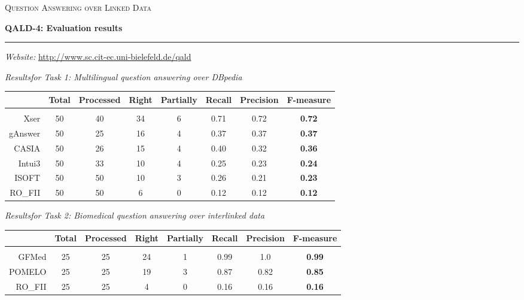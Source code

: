 \documentclass{article}
\begin{document}
\thispagestyle{empty}

\begin{center}
\textsc{\large Question Answering over Linked Data}

\vspace{.2cm}

\textbf{\huge QALD-4: Evaluation results}
\end{center}

\vspace{.4cm}

\hrule 

\vspace{.4cm}

\emph{Website:} \url{http://www.sc.cit-ec.uni-bielefeld.de/qald}

\vspace{1cm}

\emph{Results\footnotemark[1] for Task 1: Multilingual question answering over DBpedia}

\vspace{.6cm}

\begin{tabular}{rccccccc}
& Total & Processed & Right & Partially & Recall & Precision & F-measure \\
\hline \\[1ex]
Xser & 50 & 40 & 34 & 6 & 0.71 & 0.72 & \textbf{0.72} \\
gAnswer & 50 & 25 & 16 & 4 & 0.37 & 0.37 & \textbf{0.37} \\
CASIA & 50 & 26 & 15 & 4 & 0.40 & 0.32 & \textbf{0.36} \\
Intui3 & 50 & 33 & 10 & 4 & 0.25 & 0.23 & \textbf{0.24} \\
ISOFT & 50 & 50 & 10 & 3 & 0.26 & 0.21 & \textbf{0.23} \\
RO\_FII & 50 & 50 & 6 & 0 & 0.12 & 0.12 & \textbf{0.12} \\
\end{tabular}

\vspace{.8cm}

\emph{Results\footnotemark[1] for Task 2: Biomedical question answering over interlinked data} 

\vspace{.6cm}

\begin{tabular}{rccccccc}
& Total & Processed & Right & Partially & Recall & Precision & F-measure \\
\hline \\[1ex]
GFMed & 25 & 25 & 24 & 1 & 0.99 & 1.0 & \textbf{0.99} \\
POMELO & 25 & 25 & 19 & 3 & 0.87 & 0.82 & \textbf{0.85} \\
RO\_FII & 25 & 25 & 4 & 0 & 0.16 & 0.16 & \textbf{0.16} \\
\end{tabular}
\end{document}
